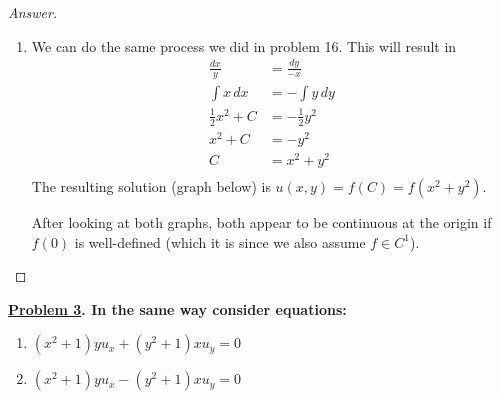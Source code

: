 \documentclass{article}
\theoremstyle{definition}
\renewcommand\qedsymbol{$\blacksquare$}
\newenvironment{ans}{\begin{proof}[Answer]\renewcommand{\qedsymbol}{}}{\end{proof}}
\newenvironment{boldenv}{\bfseries\boldmath}{}
\begin{document}
\begin{ans}
\begin{enumerate}[resume*=answers]
			\item We can do the same process we did in problem 16. This will result in
            \begin{align*}
                \frac{dx}{y} &= \frac{dy}{-x}\\
                \int x\,dx &= -\int y\,dy\\
                \frac{1}{2}x^2 + C &= -\frac{1}{2}y^2\\
                x^2 + C &= -y^2\\
                C &= x^2 + y^2\\
            \end{align*}
            The resulting solution (graph below) is $u(x,y) = f(C) = f(x^2 + y^2)$.\\
            \begin{center}
            \end{center}

            After looking at both graphs, both appear to be continuous at the origin if $f(0)$ is well-defined (which it is since we also assume $f \in C^1$).
			
		\end{enumerate}
	\end{ans}
	
	\begin{boldenv}
		\underline{Problem 3}. In the same way consider equations:
		\begin{enumerate}[(1), start=18, series=problems]
			\item $(x^2+1)yu_x + (y^2+1)xu_y = 0$
			\item $(x^2+1)yu_x - (y^2+1)xu_y = 0$
		\end{enumerate}
	\end{boldenv}
	
\end{document}
